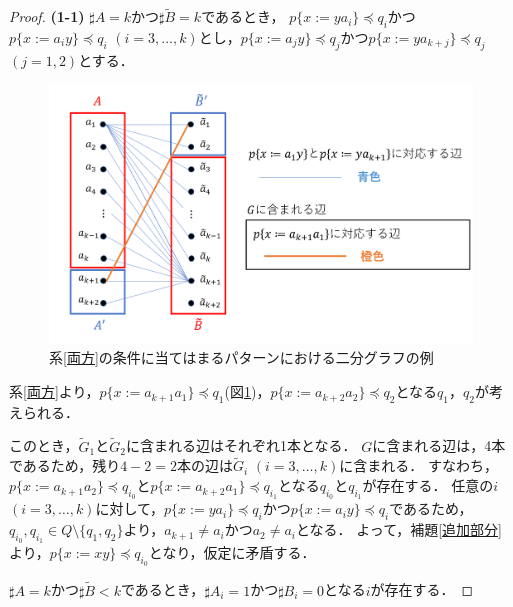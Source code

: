 \begin{proof}
\textbf{(1-1)} 
$\sharp A = k$かつ$\sharp \tilde{B} = k$であるとき，
$p \{ x:=ya_{i} \} \preceq q_{i}$かつ$p \{ x:=a_{i}y \} \preceq q_{i}$ $(i=3,\ldots,k)$とし，$p \{ x:=a_{j}y \} \preceq q_{j}$かつ$p \{ x:=ya_{k+j} \} \preceq q_{j}$ $(j=1,2)$とする．

\begin{figure}  
\centering
\includegraphics[width=\linewidth]{画像/系との関係.png}
\vspace{-1cm}
\caption{系\ref{両方}の条件に当てはまるパターンにおける二分グラフの例}
\label{系との関係}
\end{figure}

系\ref{両方}より，$p \{ x:=a_{k+1}a_{1} \} \preceq q_{1}$(図\ref{系との関係})，$p \{ x:=a_{k+2}a_{2} \} \preceq q_{2}$となる$q_{1}，q_{2}$が考えられる．

このとき，$\tilde{G}_{1}$と$\tilde{G}_{2}$に含まれる辺はそれぞれ1本となる．
$G$に含まれる辺は，4本であるため，残り$4-2=2$本の辺は$\tilde{G}_{i}$ $(i=3, \ldots, k)$に含まれる．
すなわち，$p \{ x:=a_{k+1}a_{2} \} \preceq q_{i_{0}}$と$p \{ x:=a_{k+2}a_{1} \} \preceq q_{i_{1}}$となる$q_{i_{0}}$と$q_{i_{1}}$が存在する．
任意の$i$ $(i=3, \ldots, k)$に対して，$p \{ x:=ya_{i} \} \preceq q_{i}$かつ$p \{ x:=a_{i}y \} \preceq q_{i}$であるため，$q_{i_{0}},q_{i_{1}} \in Q \setminus \{ q_{1},q_{2} \}$より，$a_{k+1} \not = a_{i}$かつ$a_{2} \not = a_{i}$となる．
よって，補題\ref{追加部分}より，$p \{ x:=xy \} \preceq q_{i_{0}}$となり，仮定に矛盾する．

$\sharp A = k$かつ$\sharp \tilde{B} < k$であるとき，$\sharp A_{i}=1$かつ$\sharp B_{i}=0$となる$i$が存在する．


\end{proof}
